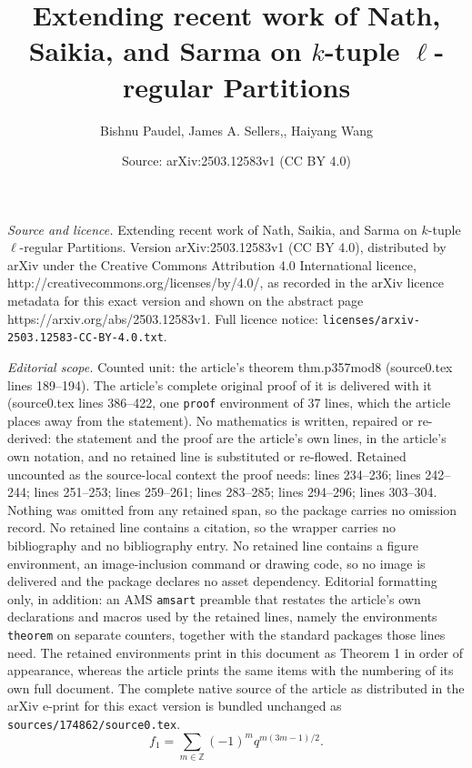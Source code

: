 \documentclass[10pt,a4paper]{amsart}
\title{Extending recent work of Nath, Saikia, and Sarma on $k$-tuple $\ell$-regular Partitions}
\author{Bishnu Paudel, James A. Sellers,, Haiyang Wang}
\date{Source: arXiv:2503.12583v1 (CC BY 4.0)}
\begin{document}
\maketitle

\noindent\emph{Source and licence.} Extending recent work of Nath, Saikia, and Sarma on $k$-tuple $\ell$-regular Partitions. Version arXiv:2503.12583v1 (CC BY 4.0), distributed by arXiv under the Creative Commons Attribution 4.0 International licence, http://creativecommons.org/licenses/by/4.0/, as recorded in the arXiv licence metadata for this exact version and shown on the abstract page https://arxiv.org/abs/2503.12583v1. Full licence notice: \texttt{licenses/arxiv-2503.12583-CC-BY-4.0.txt}.\par\smallskip

\noindent\textit{Editorial scope.} Counted unit: the article's theorem thm.p357mod8 (source0.tex lines 189--194). The article's complete original proof of it is delivered with it (source0.tex lines 386--422, one \texttt{proof} environment of 37 lines, which the article places away from the statement). No mathematics is written, repaired or re-derived: the statement and the proof are the article's own lines, in the article's own notation, and no retained line is substituted or re-flowed.  Retained uncounted as the source-local context the proof needs: lines 234--236; lines 242--244; lines 251--253; lines 259--261; lines 283--285; lines 294--296; lines 303--304.  Nothing was omitted from any retained span, so the package carries no omission record.  No retained line contains a citation, so the wrapper carries no bibliography and no bibliography entry.  No retained line contains a figure environment, an image-inclusion command or drawing code, so no image is delivered and the package declares no asset dependency.  Editorial formatting only, in addition: an AMS \texttt{amsart} preamble that restates the article's own declarations and macros used by the retained lines, namely the environments \texttt{theorem} on separate counters, together with the standard packages those lines need.  The retained environments print in this document as Theorem 1 in order of appearance, whereas the article prints the same items with the numbering of its own full document.  The complete native source of the article as distributed in the arXiv e-print for this exact version is bundled unchanged as \texttt{sources/174862/source0.tex}.
    \begin{equation}\label{f1}
        f_1=\sum_{m\in\mathbb{Z}}(-1)^mq^{m(3m-1)/2}.
    \end{equation}
\end{document}
